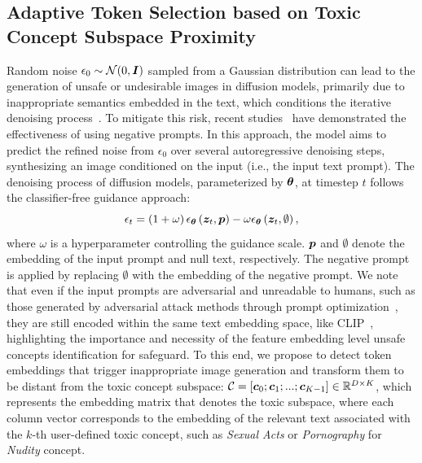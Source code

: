 

\subsection{Adaptive Token Selection based on Toxic Concept Subspace Proximity}\label{sec:subsec:concept_subspace}


Random noise $\epsilon_0\sim\mathcal{N}(0,\boldsymbol{I})$ sampled from a Gaussian distribution can lead to the generation of unsafe or undesirable images in diffusion models, primarily due to inappropriate semantics embedded in the text, which conditions the iterative denoising process~\citep{rombach2022high,ho2022classifier}. To mitigate this risk, recent studies~\citep{miyake2023negative,schramowski2023safe,ban2024understanding} have demonstrated the effectiveness of using negative prompts. In this approach, the model aims to predict the refined noise from $\epsilon_0$ over several autoregressive denoising steps, synthesizing an image conditioned on the input (i.e., the input text prompt).
The denoising process of diffusion models, parameterized by $\boldsymbol{\theta}$, at timestep $t$ follows the classifier-free guidance approach:
\begin{equation}
\epsilon_t=\left(1+\omega\right)\epsilon_{\boldsymbol\theta}\left(\boldsymbol{z}_t,\boldsymbol{p}\right)-\omega\epsilon_{\boldsymbol\theta}\left(\boldsymbol{z}_t,\emptyset\right),
\end{equation}
where $\omega$ is a hyperparameter controlling the guidance scale. 
$\boldsymbol{p}$ and $\emptyset$ denote the embedding of the input prompt and null text, respectively. 
The negative prompt is applied by replacing $\emptyset$ with the embedding of the negative prompt. We note that even if the input prompts are adversarial and unreadable to humans, such as those generated by adversarial attack methods through prompt optimization~\citep{tsai2024ring,yang2024mma,chin2024prompting4debugging}, they are still encoded within the same text embedding space, like CLIP~\citep{radford2021learning}, highlighting the importance and necessity of the feature embedding level unsafe concepts identification for safeguard.
To this end, we propose to detect token embeddings that trigger inappropriate image generation and transform them to be distant from the toxic concept subspace: $\mathcal{C}=\left[\boldsymbol{c}_0; \boldsymbol{c}_1; ...; \boldsymbol{c}_{K-1}\right]\in\mathbb{R}^{D\times K}$, which represents the embedding matrix that denotes the toxic subspace, where each column vector  corresponds to the embedding of the relevant text associated with the $k$-th user-defined toxic concept, such as \textit{Sexual Acts} or \textit{Pornography} for \textit{Nudity} concept.

